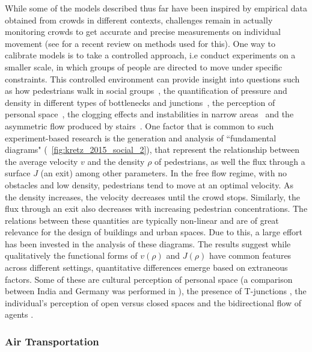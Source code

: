 While some of the models described thus far have been inspired by empirical data obtained from crowds in different contexts, challenges remain in actually monitoring crowds to get accurate and precise measurements on individual movement (see \cite{benenson_2014_ten} for a recent review on methods used for this). 
One way to calibrate models is to take a controlled approach, i.e conduct experiments on a smaller scale, in which groups of people are directed to move under specific constraints. This controlled environment can provide insight into questions such as how pedestrians walk in social groups~\cite{moussaid_2010_walking}, the quantification of pressure and density in different types of bottlenecks and junctions~\cite{zhang_2014_quantification}, the perception of personal space~\cite{ducourant_2005_timing}, the clogging effects and instabilities in narrow areas~\cite{moussaid_2012_traffic,bukacek_2014_experimental} and the asymmetric flow produced by stairs~\cite{corbetta_2015_asymmetric}. One factor that is common to such experiment-based research is the generation and analysis of ``fundamental diagrams" \cite{jelic_2012_properties} (\figurename~\ref{fig:kretz_2015_social_2}), that represent the relationship between the average velocity $v$ and the density $\rho$ of pedestrians, as well the flux through a surface  $J$ (an exit) among other parameters. In the free flow regime, with no obstacles and low density, pedestrians tend to move at an optimal velocity. As the density increases, the velocity decreases until the crowd stops. Similarly, the flux through an exit also decreases with increasing pedestrian concentrations. The relations between these quantities are typically non-linear and are of great relevance for the design of buildings and urban spaces. Due to this, a large effort has been invested in the analysis of these diagrams. The results suggest while qualitatively the functional forms of $v(\rho)$ and $J(\rho)$ have common features across different settings, quantitative differences emerge based on extraneous factors. Some of these are cultural perception of personal space (a comparison between India and Germany was performed in \cite{chattaraj_2009_comparison}), the presence of T-junctions \cite{zhang_2013_experimental}, the individual's perception of open versus closed spaces \cite{zhang_2014_effects} and the bidirectional flow of agents \cite{zhang_2014_comparison}. 

\subsubsection{Air Transportation}
\label{sec:air}

